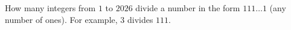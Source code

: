 How many integers from $1$ to $2026$ divide a number in the form $111\dots 1$ (any number of ones). For example, $3$ divides $111$.
